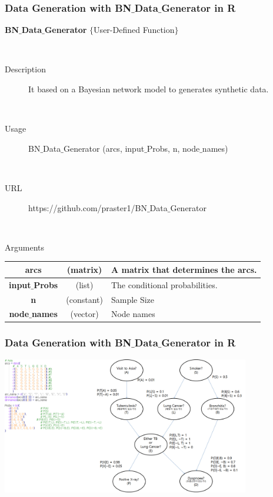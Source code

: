 \documentclass{beamer}
\begin{document}
\begin{frame}
\frametitle{Data Generation with BN$\_$Data$\_$Generator in R}

{\scriptsize{}
	\textbf{BN$\_$Data$\_$Generator} $\{$User-Defined Function$\}$

	{}\	
	
	\begin{description}
		\item[Description] It based on a Bayesian network model to generates synthetic data.
		
		{}\
		
		\item[Usage] BN$\_$Data$\_$Generator (arcs, input$\_$Probs, n, node$\_$names)

		{}\
		
		\item[URL] https://github.com/praster1/BN$\_$Data$\_$Generator		

		{}\
		
		\item[Arguments]
	\end{description}
	
	\begin{center}
				\begin{tabular}{c|c|l}
					\hline 
					\textbf{arcs} & (matrix) & A matrix that determines the arcs.\tabularnewline
					\hline 
					\textbf{input$\_$Probs} & (list) & The conditional probabilities.\tabularnewline
					\hline 
					\textbf{n} & (constant) & Sample Size\tabularnewline
					\hline 
					\textbf{node$\_$names} & (vector) & Node names\tabularnewline
					\hline 
				\end{tabular}
	\end{center}
}
\end{frame}




\begin{frame}
\frametitle{Data Generation with BN$\_$Data$\_$Generator in R}

{\scriptsize{}
	\begin{center}
		\includegraphics[height=170pt]{images/image24}
	\end{center}
}
\end{frame}
\end{document}
